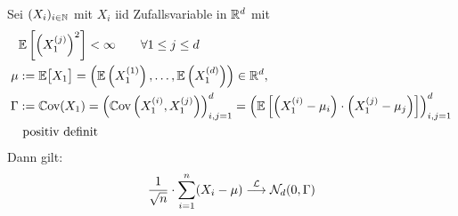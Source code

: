 \begin{korollar}\label{korollar6.3}
	Sei $(X_i)_{i\in\mathbb{N}}$ mit $X_i$ iid Zufallsvariable in $\mathbb{R}^d$ mit
	\begin{align*}
		&\mathbb{E}\left[\left(X_1^{(j)}\right)^2\right]<\infty\qquad\forall 1\leq j\leq d\\
		\mu&:=\mathbb{E}\big[X_1\big]=\left(\mathbb{E}\left(X_1^{(1)}\right),\ldots,\mathbb{E}\left(X_1^{(d)}\right)\right)\in\mathbb{R}^d,\\
		\Gamma&:=\mathbb{C}\text{ov}(X_1)
		=\left(\mathbb{C}\text{ov}\left(X_1^{(i)},X_1^{(j)}\right)\right)_{i,j=1}^d
		=\left(\mathbb{E}\left[\left(X_1^{(i)}-\mu_i\right)\cdot\left(X_1^{(j)}-\mu_j\right)\right]\right)_{i,j=1}^d\\&\text{ positiv definit}
	\end{align*}
	Dann gilt:
	\begin{align*}
		\frac{1}{\sqrt{n}}\cdot\sum\limits_{i=1}^n(X_i-\mu)\stackrel{\mathcal{L}}{\longrightarrow}\mathcal{N}_d(0,\Gamma)
	\end{align*}
\end{korollar}

